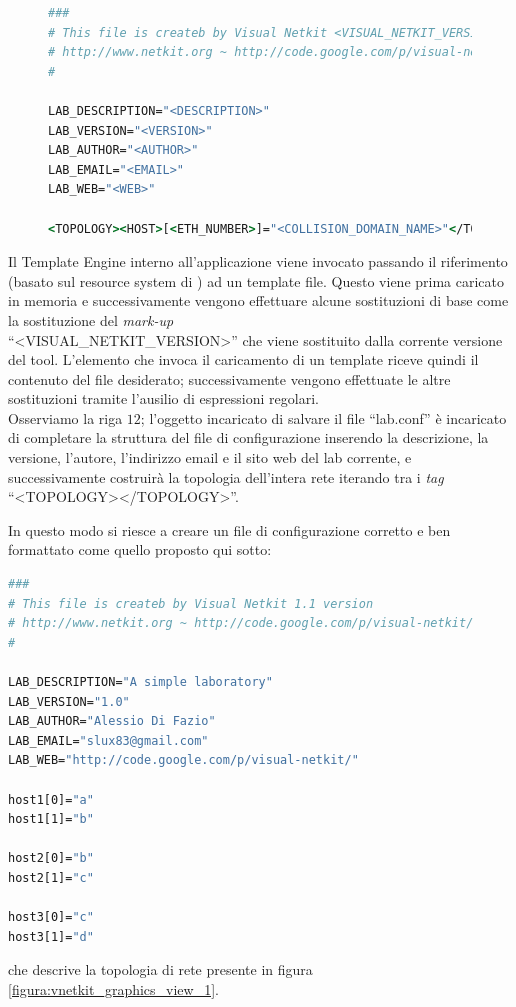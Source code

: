 \begin{figure}[!htb]
\begin{lstlisting}[language=csh]
###
# This file is createb by Visual Netkit <VISUAL_NETKIT_VERSION> version
# http://www.netkit.org ~ http://code.google.com/p/visual-netkit/
#

LAB_DESCRIPTION="<DESCRIPTION>"
LAB_VERSION="<VERSION>"
LAB_AUTHOR="<AUTHOR>"
LAB_EMAIL="<EMAIL>"
LAB_WEB="<WEB>"

<TOPOLOGY><HOST>[<ETH_NUMBER>]="<COLLISION_DOMAIN_NAME>"</TOPOLOGY>
\end{lstlisting}
\end{figure}
Il Template Engine interno all'applicazione viene invocato passando il riferimento (basato sul resource system di \qt{}) ad un template file. Questo viene prima caricato in memoria e successivamente vengono effettuare alcune sostituzioni di base come la sostituzione del \emph{mark-up}\\
``<VISUAL\_{}NETKIT\_{}VERSION>'' che viene sostituito dalla corrente versione del tool.
L'elemento che invoca il caricamento di un template riceve quindi il contenuto del file desiderato; successivamente vengono effettuate le altre sostituzioni tramite l'ausilio di espressioni regolari.\\
Osserviamo la riga $12$; l'oggetto incaricato di salvare il file ``lab.conf'' è incaricato di completare la struttura del file di configurazione inserendo la descrizione, la versione, l'autore, l'indirizzo email e il sito web del lab corrente, e successivamente costruirà la topologia dell'intera rete iterando tra i \emph{tag} ``<TOPOLOGY></TOPOLOGY>''.

In questo modo si riesce a creare un file di configurazione corretto e ben formattato come quello proposto qui sotto:
\begin{lstlisting}[language=csh]
###
# This file is createb by Visual Netkit 1.1 version
# http://www.netkit.org ~ http://code.google.com/p/visual-netkit/
#

LAB_DESCRIPTION="A simple laboratory"
LAB_VERSION="1.0"
LAB_AUTHOR="Alessio Di Fazio"
LAB_EMAIL="slux83@gmail.com"
LAB_WEB="http://code.google.com/p/visual-netkit/"

host1[0]="a"
host1[1]="b"

host2[0]="b"
host2[1]="c"

host3[0]="c"
host3[1]="d"
\end{lstlisting}
che descrive la topologia di rete presente in figura \ref{figura:vnetkit_graphics_view_1}.

